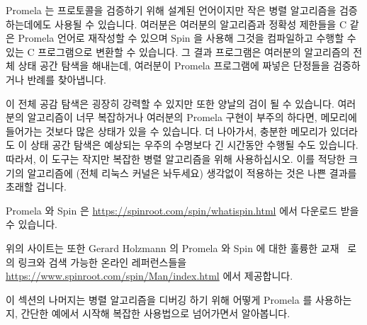 Promela 는 프로토콜을 검증하기 위해 설계된 언어이지만 작은 병렬 알고리즘을
검증하는데에도 사용될 수 있습니다.
여러분은 여러분의 알고리즘과 정확성 제한들을 C 같은 Promela 언어로 재작성할 수
있으며 Spin 을 사용해 그것을 컴파일하고 수행할 수 있는 C 프로그램으로 변환할 수
있습니다.
그 결과 프로그램은 여러분의 알고리즘의 전체 상태 공간 탐색을 해내는데, 여러분이
Promela 프로그램에 짜넣은 단정들을 검증하거나 반례를 찾아냅니다.

이 전체 공감 탐색은 굉장히 강력할 수 있지만 또한 양날의 검이 될 수 있습니다.
여러분의 알고리즘이 너무 복잡하거나 여러분의 Promela 구현이 부주의 하다면,
메모리에 들어가는 것보다 많은 상태가 있을 수 있습니다.
더 나아가서, 충분한 메모리가 있더라도 이 상태 공간 탐색은 예상되는 우주의
수명보다 긴 시간동안 수행될 수도 있습니다.
따라서, 이 도구는 작지만 복잡한 병렬 알고리즘을 위해 사용하십시오.
이를 적당한 크기의 알고리즘에 (전체 리눅스 커널은 놔두세요) 생각없이 적용하는
것은 나쁜 결과를 초래할 겁니다.

\iffalse

Promela is a language designed to help verify protocols, but which
can also be used to verify small parallel algorithms.
You recode your algorithm and correctness constraints in the C-like
language Promela, and then use Spin to translate it into a C program
that you can compile and run.
The resulting program carries out a full state-space search of your
algorithm, either verifying or finding counter-examples for
assertions that you can associate with in your Promela program.

This full-state search can be extremely powerful, but can also be a two-edged
sword.
If your algorithm is too complex or your Promela implementation is
careless, there might be more states than fit in memory.
Furthermore, even given sufficient memory, the state-space search might
well run for longer than the expected lifetime of the universe.
Therefore, use this tool for compact but complex parallel algorithms.
Attempts to naively apply it to even moderate-scale algorithms (let alone
the full Linux kernel) will end badly.

\fi

Promela 와 Spin 은
\url{https://spinroot.com/spin/whatispin.html} 에서 다운로드 받을 수 있습니다.

위의 사이트는 또한 Gerard Holzmann 의 Promela 와 Spin 에 대한 훌륭한
교재~\cite{Holzmann03a} 로의 링크와 검색 가능한 온라인 레퍼런스들을
\url{https://www.spinroot.com/spin/Man/index.html} 에서 제공합니다.

이 섹션의 나머지는 병렬 알고리즘을 디버깅 하기 위해 어떻게 Promela 를
사용하는지, 간단한 예에서 시작해 복잡한 사용법으로 넘어가면서 알아봅니다.

